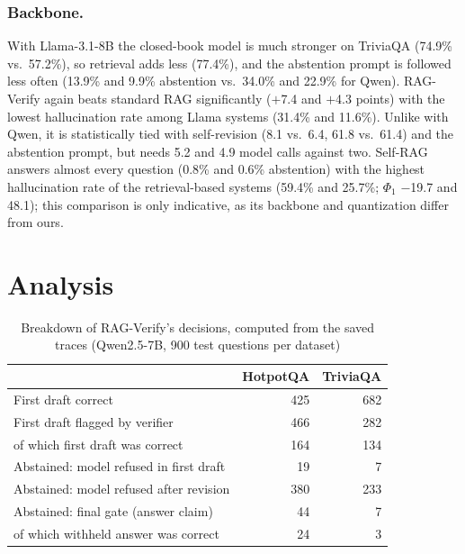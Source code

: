 \documentclass{svproc}
\begin{document}
\subsubsection{Backbone.} With Llama-3.1-8B the closed-book model is much stronger on TriviaQA (74.9\% vs.\ 57.2\%), so retrieval adds less (77.4\%), and the abstention prompt is followed less often (13.9\% and 9.9\% abstention vs.\ 34.0\% and 22.9\% for Qwen). RAG-Verify again beats standard RAG significantly ($+$7.4 and $+$4.3 points) with the lowest hallucination rate among Llama systems (31.4\% and 11.6\%). Unlike with Qwen, it is statistically tied with self-revision (8.1 vs.\ 6.4, 61.8 vs.\ 61.4) and the abstention prompt, but needs 5.2 and 4.9 model calls against two. Self-RAG answers almost every question (0.8\% and 0.6\% abstention) with the highest hallucination rate of the retrieval-based systems (59.4\% and 25.7\%; $\Phi_1$ $-$19.7 and 48.1); this comparison is only indicative, as its backbone and quantization differ from ours.

\section{Analysis}
\begin{table}[htb]
\caption{Breakdown of RAG-Verify's decisions, computed from the saved traces (Qwen2.5-7B, 900 test questions per dataset)}
\label{tab:trace}
\centering
\begin{tabular}{lrr}
\toprule
 & HotpotQA & TriviaQA \\
\midrule
First draft correct & 425 & 682 \\
First draft flagged by verifier & 466 & 282 \\
\quad of which first draft was correct & 164 & 134 \\
Abstained: model refused in first draft & 19 & 7 \\
Abstained: model refused after revision & 380 & 233 \\
Abstained: final gate (answer claim) & 44 & 7 \\
\quad of which withheld answer was correct & 24 & 3 \\
\bottomrule
\end{tabular}
\end{table}
\end{document}
